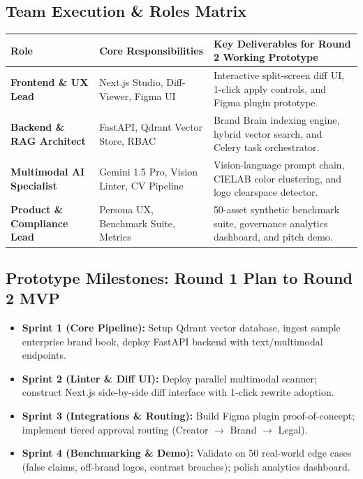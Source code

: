 \documentclass[10pt,a4paper]{article}
\begin{document}
\subsection{Team Execution \& Roles Matrix}
\begin{table}[h!]
\centering
\small
\renewcommand{\arraystretch}{1.2}
\begin{tabularx}{\textwidth}{p{3.2cm} p{4.2cm} X}
\toprule
\textbf{Role} & \textbf{Core Responsibilities} & \textbf{Key Deliverables for Round 2 Working Prototype} \\
\midrule
\textbf{Frontend \& UX Lead} & Next.js Studio, Diff-Viewer, Figma UI & Interactive split-screen diff UI, 1-click apply controls, and Figma plugin prototype. \\
\midrule
\textbf{Backend \& RAG Architect} & FastAPI, Qdrant Vector Store, RBAC & Brand Brain indexing engine, hybrid vector search, and Celery task orchestrator. \\
\midrule
\textbf{Multimodal AI Specialist} & Gemini 1.5 Pro, Vision Linter, CV Pipeline & Vision-language prompt chain, CIELAB color clustering, and logo clearspace detector. \\
\midrule
\textbf{Product \& Compliance Lead} & Persona UX, Benchmark Suite, Metrics & 50-asset synthetic benchmark suite, governance analytics dashboard, and pitch demo. \\
\bottomrule
\end{tabularx}
\end{table}

\vspace{0.15cm}

\subsection{Prototype Milestones: Round 1 Plan to Round 2 MVP}
\begin{itemize}[leftmargin=*,itemsep=2pt]
  \item \textbf{Sprint 1 (Core Pipeline):} Setup Qdrant vector database, ingest sample enterprise brand book, deploy FastAPI backend with text/multimodal endpoints.
  \item \textbf{Sprint 2 (Linter \& Diff UI):} Deploy parallel multimodal scanner; construct Next.js side-by-side diff interface with 1-click rewrite adoption.
  \item \textbf{Sprint 3 (Integrations \& Routing):} Build Figma plugin proof-of-concept; implement tiered approval routing (Creator $\rightarrow$ Brand $\rightarrow$ Legal).
  \item \textbf{Sprint 4 (Benchmarking \& Demo):} Validate on 50 real-world edge cases (false claims, off-brand logos, contrast breaches); polish analytics dashboard.
\end{itemize}
\end{document}
